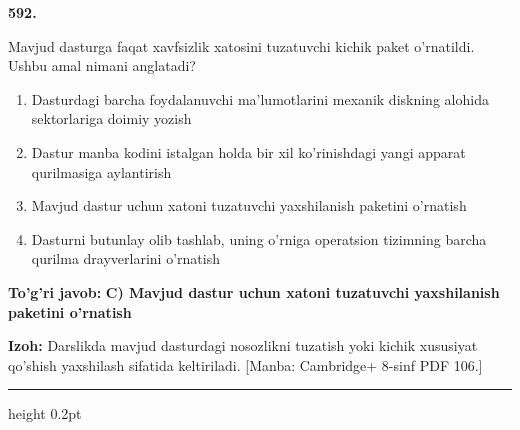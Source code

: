 \documentclass[10pt,a4paper]{article}
\begin{document}
{\bfseries\sffamily\color{ink} 592.}
\par
Mavjud dasturga faqat xavfsizlik xatosini tuzatuvchi kichik paket o'rnatildi. Ushbu amal nimani anglatadi?
\begin{enumerate}[label=\Alph*),leftmargin=9mm]
\item Dasturdagi barcha foydalanuvchi ma'lumotlarini mexanik diskning alohida sektorlariga doimiy yozish
\item Dastur manba kodini istalgan holda bir xil ko'rinishdagi yangi apparat qurilmasiga aylantirish
\item Mavjud dastur uchun xatoni tuzatuvchi yaxshilanish paketini o'rnatish
\item Dasturni butunlay olib tashlab, uning o'rniga operatsion tizimning barcha qurilma drayverlarini o'rnatish
\end{enumerate}
\begin{tcolorbox}[enhanced,breakable,colback=teal!4,colframe=teal!60!black,boxrule=0.45pt,arc=1.2mm,left=2.7mm,right=2.7mm,top=1.8mm,bottom=1.8mm,before skip=2mm,after skip=2mm]
{\bfseries\sffamily\color{teal}To'g'ri javob:} \textbf{C) Mavjud dastur uchun xatoni tuzatuvchi yaxshilanish paketini o'rnatish}
\par\smallskip
{\bfseries Izoh:} Darslikda mavjud dasturdagi nosozlikni tuzatish yoki kichik xususiyat qo'shish yaxshilash sifatida keltiriladi. [Manba: Cambridge+ 8-sinf PDF 106.]
\end{tcolorbox}
\vspace{2mm}\hrule height 0.2pt\vspace{3mm}
\end{document}
